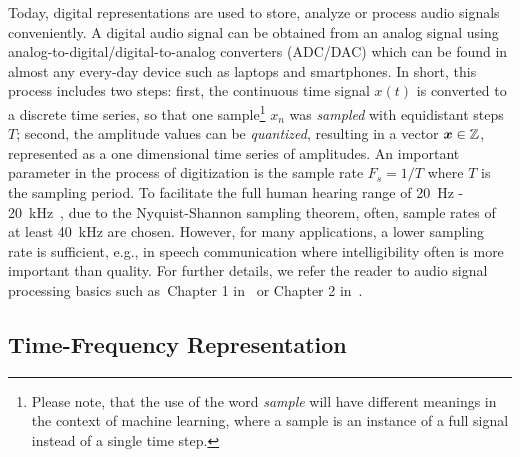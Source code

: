 Today, digital representations are used to store, analyze or process audio signals conveniently.
A digital audio signal can be obtained from an analog signal using analog-to-digital/digital-to-analog converters (ADC/DAC) which can be found in almost any every-day device such as laptops and smartphones.
In short, this process includes two steps: first, the continuous time signal \(x(t)\) is converted to a discrete time series, so that one sample\footnote{Please note, that the use of the word \emph{sample} will have different meanings in the context of machine learning, where a sample is an instance of a full signal instead of a single time step.} \(x_n\) was \emph{sampled} with equidistant steps \(T\); second, the amplitude values can be \emph{quantized}, resulting in a vector \({\bm{x}} \in {\mathbb{Z}}\), represented as a one dimensional time series of amplitudes.
An important parameter in the process of digitization is the sample rate \(F_s = 1/T\) where \(T\) is the sampling period.
To facilitate the full human hearing range of 20~\si{\hertz} - 20~\si{\kilo\hertz}~\cite{fastl90, moore89}, due to the Nyquist-Shannon sampling theorem, often, sample rates of at least 40~\si{\kilo\hertz} are chosen.
However, for many applications, a lower sampling rate is sufficient, e.g., in speech communication where intelligibility often is more important than quality.
For further details, we refer the reader to audio signal processing basics such as~Chapter 1 in~\cite{proakis96} or Chapter 2 in~\cite{Mueller15}.

\hypertarget{time-frequency-representation}{%
\subsection{Time-Frequency Representation}\label{sub:time-frequency-representation}}

